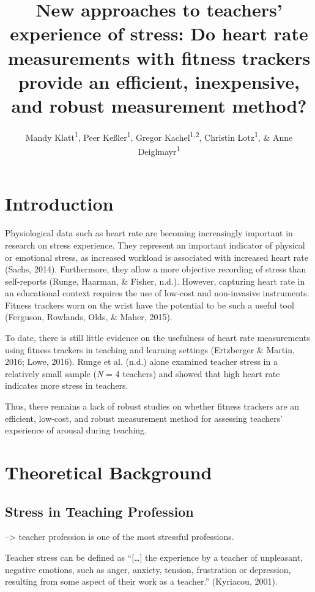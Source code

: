 \documentclass[
  man,floatsintext]{apa6}
\title{New approaches to teachers' experience of stress: Do heart rate measurements with fitness trackers provide an efficient, inexpensive, and robust measurement method?}
\author{Mandy Klatt\textsuperscript{1}, Peer Keßler\textsuperscript{1}, Gregor Kachel\textsuperscript{1,2}, Christin Lotz\textsuperscript{1}, \& Anne Deiglmayr\textsuperscript{1}}
\date{}
\affiliation{\vspace{0.5cm}\textsuperscript{1} Leipzig University\\\textsuperscript{2} Max Planck Institute for Evolutionary Anthropology}
\begin{document}
\maketitle

\hypertarget{introduction}{%
\section{Introduction}\label{introduction}}

Physiological data such as heart rate are becoming increasingly important in research on stress experience. They represent an important indicator of physical or emotional stress, as increased workload is associated with increased heart rate (Sachs, 2014). Furthermore, they allow a more objective recording of stress than self-reports (Runge, Haarman, \& Fisher, n.d.). However, capturing heart rate in an educational context requires the use of low-cost and non-invasive instruments. Fitness trackers worn on the wrist have the potential to be such a useful tool (Ferguson, Rowlands, Olds, \& Maher, 2015).

To date, there is still little evidence on the usefulness of heart rate measurements using fitness trackers in teaching and learning settings (Ertzberger \& Martin, 2016; Lowe, 2016). Runge et al. (n.d.) alone examined teacher stress in a relatively small sample (\emph{N} = 4 teachers) and showed that high heart rate indicates more stress in teachers.

Thus, there remains a lack of robust studies on whether fitness trackers are an efficient, low-cost, and robust measurement method for assessing teachers' experience of arousal during teaching.

\hypertarget{theoretical-background}{%
\section{Theoretical Background}\label{theoretical-background}}

\hypertarget{stress-in-teaching-profession}{%
\subsection{Stress in Teaching Profession}\label{stress-in-teaching-profession}}

--\textgreater{} teacher profession is one of the most stressful professions.

Teacher stress can be defined as ``{[}\ldots{]} the experience by a teacher of unpleasant, negative emotions, such as anger, anxiety, tension, frustration or depression, resulting from some aspect of their work as a teacher.'' (Kyriacou, 2001).
\end{document}
